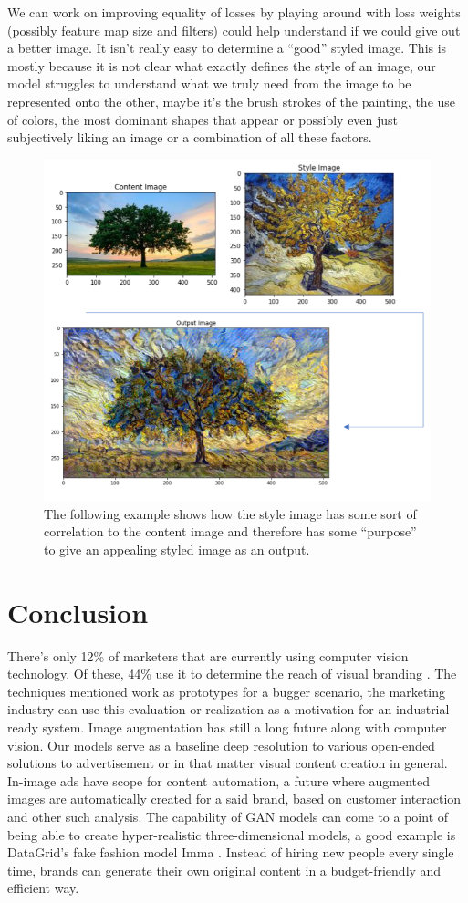 \documentclass[preprint,12pt]{elsarticle}
\begin{document}
We can work on improving equality of losses by playing around with loss weights (possibly feature map size and filters) could help understand if we could give out a better image. It isn’t really easy to determine a “good” styled image. This is mostly because it is not clear what exactly defines the style of an image, our model struggles to understand what we truly need from the image to be represented onto the other, maybe it’s the brush strokes of the painting, the use of colors, the most dominant shapes that appear or possibly even just subjectively liking an image or a combination of all these factors.

\begin{figure}[!h]
\centering\includegraphics[width=0.7\linewidth]{nst_final.png}
\caption{The following example shows how the style image has some sort of correlation to the content image and therefore has some “purpose” to give an appealing styled image as an output.}
\label{fig:nst_final}
\end{figure}

\section{Conclusion}
\label{S:6}
There’s only 12\% of marketers that are currently using computer vision technology. Of these,  44\% use it to determine the reach of visual branding \cite{Ben2019Market}. The techniques mentioned work as prototypes for a bugger scenario, the marketing industry can use this evaluation or realization as a motivation for an industrial ready system. Image augmentation has still a long future along with computer vision. Our models serve as a baseline deep resolution to various open-ended solutions to advertisement or in that matter visual content creation in general. In-image ads have scope for content automation, a future where augmented images are automatically created for a said brand, based on customer interaction and other such analysis. 
The capability of GAN models can come to a point of being able to create hyper-realistic three-dimensional models, a good example is DataGrid’s fake fashion model Imma \cite{Mileva2019}. Instead of hiring new people every single time, brands can generate their own original content in a budget-friendly and efficient way. 
\end{document}
